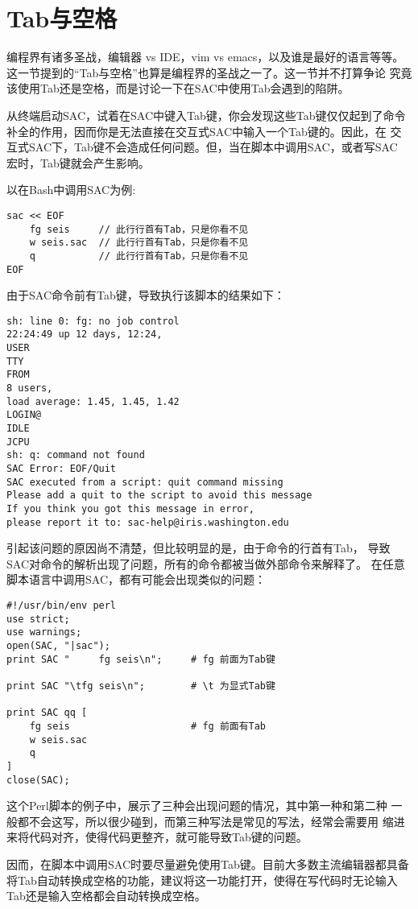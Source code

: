 \section{Tab与空格}
编程界有诸多圣战，编辑器 vs IDE，vim vs emacs，以及谁是最好的语言等等。
这一节提到的``Tab与空格''也算是编程界的圣战之一了。这一节并不打算争论
究竟该使用Tab还是空格，而是讨论一下在SAC中使用Tab会遇到的陷阱。

从终端启动SAC，试着在SAC中键入Tab键，你会发现这些Tab键仅仅起到了命令
补全的作用，因而你是无法直接在交互式SAC中输入一个Tab键的。因此，在
交互式SAC下，Tab键不会造成任何问题。但，当在脚本中调用SAC，或者写SAC
宏时，Tab键就会产生影响。

以在Bash中调用SAC为例:
\begin{verbatim}
sac << EOF
    fg seis     // 此行行首有Tab，只是你看不见
    w seis.sac  // 此行行首有Tab，只是你看不见
    q           // 此行行首有Tab，只是你看不见
EOF
\end{verbatim}
由于SAC命令前有Tab键，导致执行该脚本的结果如下：
\begin{verbatim}
sh: line 0: fg: no job control
22:24:49 up 12 days, 12:24,
USER
TTY
FROM
8 users,
load average: 1.45, 1.45, 1.42
LOGIN@
IDLE
JCPU
sh: q: command not found
SAC Error: EOF/Quit
SAC executed from a script: quit command missing
Please add a quit to the script to avoid this message
If you think you got this message in error,
please report it to: sac-help@iris.washington.edu
\end{verbatim}

引起该问题的原因尚不清楚，但比较明显的是，由于命令的行首有Tab，
导致SAC对命令的解析出现了问题，所有的命令都被当做外部命令来解释了。
在任意脚本语言中调用SAC，都有可能会出现类似的问题：
\begin{verbatim}
#!/usr/bin/env perl
use strict;
use warnings;
open(SAC, "|sac");
print SAC "     fg seis\n";     # fg 前面为Tab键

print SAC "\tfg seis\n";        # \t 为显式Tab键

print SAC qq [
    fg seis                     # fg 前面有Tab
    w seis.sac
    q
]
close(SAC);
\end{verbatim}
这个Perl脚本的例子中，展示了三种会出现问题的情况，其中第一种和第二种
一般都不会这写，所以很少碰到，而第三种写法是常见的写法，经常会需要用
缩进来将代码对齐，使得代码更整齐，就可能导致Tab键的问题。

因而，在脚本中调用SAC时要尽量避免使用Tab键。目前大多数主流编辑器都具备
将Tab自动转换成空格的功能，建议将这一功能打开，使得在写代码时无论输入
Tab还是输入空格都会自动转换成空格。
